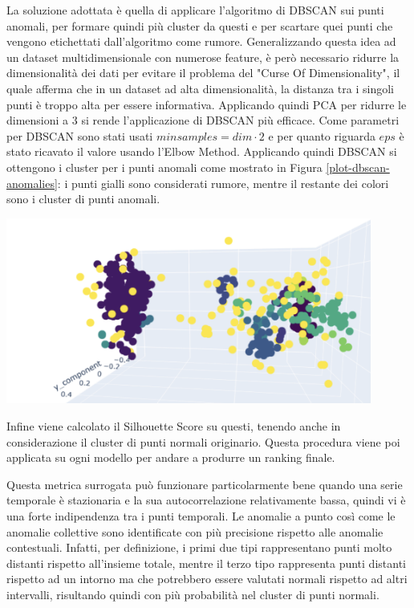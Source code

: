 La soluzione adottata è quella di applicare l'algoritmo di DBSCAN sui punti anomali, per formare quindi più cluster da questi e per scartare quei punti che vengono etichettati dall'algoritmo come rumore.
Generalizzando questa idea ad un dataset multidimensionale con numerose feature, è però necessario ridurre la dimensionalità dei dati per evitare il problema del "Curse Of Dimensionality", il quale afferma che in un dataset ad alta dimensionalità, la distanza tra i singoli punti è troppo alta per essere informativa.
Applicando quindi PCA per ridurre le dimensioni a 3 si rende l'applicazione di DBSCAN più efficace. Come parametri per DBSCAN sono stati usati $minsamples=dim \cdot 2$ e per quanto riguarda $eps$ è stato ricavato il valore usando l'Elbow Method.
Applicando quindi DBSCAN si ottengono i cluster per i punti anomali come mostrato in Figura \ref{plot-dbscan-anomalies}: i punti gialli sono considerati rumore, mentre il restante dei colori sono i cluster di punti anomali.

\begin{center}
	\includegraphics[width=12cm, scale=1]{images/plot-dbscan-anomalies}
    \captionsetup{type=figure}
    \label{plot-dbscan-anomalies}
\end{center}

Infine viene calcolato il Silhouette Score su questi, tenendo anche in considerazione il cluster di punti normali originario. Questa procedura viene poi applicata su ogni modello per andare a produrre un ranking finale.

Questa metrica surrogata può funzionare particolarmente bene quando una serie temporale è stazionaria e la sua autocorrelazione relativamente bassa, quindi vi è una forte indipendenza tra i punti temporali. Le anomalie a punto così come le anomalie collettive sono identificate con più precisione rispetto alle anomalie contestuali. Infatti, per definizione, i primi due tipi rappresentano punti molto distanti rispetto all'insieme totale, mentre il terzo tipo rappresenta punti distanti rispetto ad un intorno ma che potrebbero essere valutati normali rispetto ad altri intervalli, risultando quindi con più probabilità nel cluster di punti normali.

